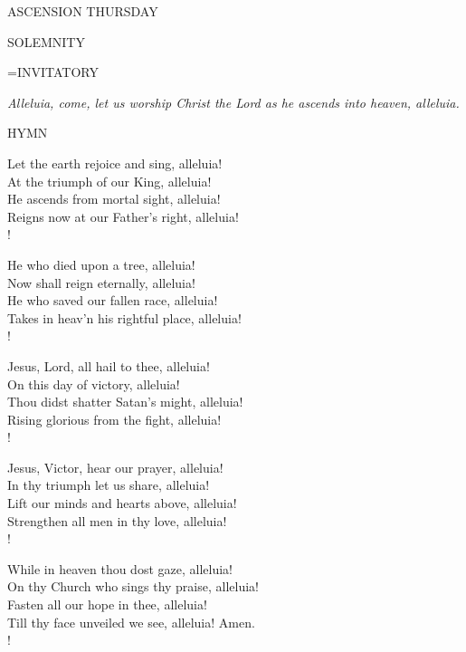 \begin{center}
\normalsize \begin{center}\normalsize ASCENSION THURSDAY\\
\end{center}
\footnotesize SOLEMNITY\\
\end{center}

\hangindent=\parindent \small{INVITATORY}
\begin{center}
\textit{Alleluia, come, let us worship Christ the Lord as he ascends into heaven, alleluia.\\}
\end{center}

\noindent\small{\uppercase{Hymn}}\normalsize\label{ascension:hymn}
\begin{cverse}
Let the earth rejoice and sing, alleluia!\\
At the triumph of our King, alleluia!\\
He ascends from mortal sight, alleluia!\\
Reigns now at our Father's right, alleluia!\\!

He who died upon a tree, alleluia!\\
Now shall reign eternally, alleluia!\\
He who saved our fallen race, alleluia!\\
Takes in heav'n his rightful place, alleluia!\\!

Jesus, Lord, all hail to thee, alleluia!\\
On this day of victory, alleluia!\\
Thou didst shatter Satan's might, alleluia!\\
Rising glorious from the fight, alleluia!\\!

Jesus, Victor, hear our prayer, alleluia!\\
In thy triumph let us share, alleluia!\\
Lift our minds and hearts above, alleluia!\\
Strengthen all men in thy love, alleluia!\\!

While in heaven thou dost gaze, alleluia!\\
On thy Church who sings thy praise, alleluia!\\
Fasten all our hope in thee, alleluia!\\
Till thy face unveiled we see, alleluia! Amen.\\!
\end{cverse}

